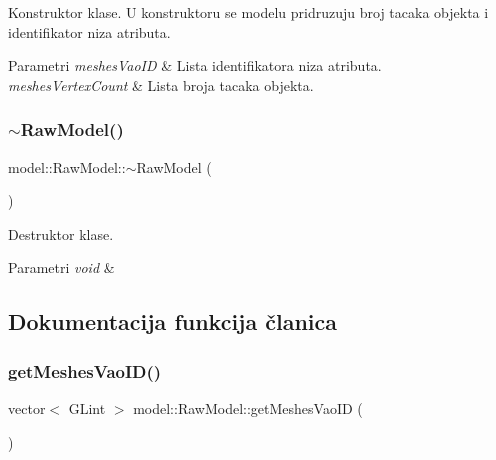 Konstruktor klase. U konstruktoru se modelu pridruzuju broj tacaka objekta i identifikator niza atributa. 


\begin{DoxyParams}{Parametri}
{\em meshes\+Vao\+ID} & Lista identifikatora niza atributa. \\
\hline
{\em meshes\+Vertex\+Count} & Lista broja tacaka objekta. \\
\hline
\end{DoxyParams}
\mbox{\label{classmodel_1_1RawModel_a44e687484478b0747abe25baa3533b71}} 
\subsubsection{\texorpdfstring{$\sim$\+Raw\+Model()}{~RawModel()}}
{\footnotesize\ttfamily model\+::\+Raw\+Model\+::$\sim$\+Raw\+Model (\begin{DoxyParamCaption}{ }\end{DoxyParamCaption})}



Destruktor klase. 


\begin{DoxyParams}{Parametri}
{\em void} & \\
\hline
\end{DoxyParams}


\subsection{Dokumentacija funkcija članica}
\mbox{\label{classmodel_1_1RawModel_af13c9200466649ab5900eaeeeeefdbc4}} 
\subsubsection{\texorpdfstring{get\+Meshes\+Vao\+I\+D()}{getMeshesVaoID()}}
{\footnotesize\ttfamily vector$<$ G\+Lint $>$ model\+::\+Raw\+Model\+::get\+Meshes\+Vao\+ID (\begin{DoxyParamCaption}\item[{void}]{ }\end{DoxyParamCaption})}



